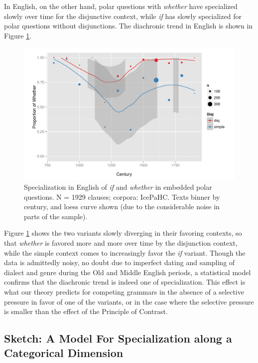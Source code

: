 In English, on the other hand, polar questions with \textsl{whether} have specialized slowly over time for the disjunctive context, while \textsl{if} has slowly specialized for polar questions without disjunctions.
The diachronic trend in English is shown in Figure \ref{whetherfig}.

\begin{figure}
    \begin{center}
    \includegraphics[scale=.7]{whetherifEngLoess.pdf}
    \caption{Specialization in English of \textsl{if} and \textsl{whether} in embedded polar questions. N = 1929 clauses; corpora: IcePaHC. Texts binner by century, and loess curve shown (due to the considerable noise in parts of the sample).}
    \label{whetherfig}
    \end{center}
\end{figure}

Figure \ref{whetherfig} shows the two variants slowly diverging in their favoring contexts, so that \textsl{whether} is favored more and more over time by the disjunction context, while the simple context comes to increasingly favor the \textsl{if} variant.
Though the data is admittedly noisy, no doubt due to imperfect dating and sampling of dialect and genre during the Old and Middle English periods, a statistical model confirms that the diachronic trend is indeed one of specialization. 
This effect is what our theory predicts for competing grammars in the absence of a selective pressure in favor of one of the variants, or in the case where the selective pressure is smaller than the effect of the Principle of Contrast.

\subsection{Sketch: A Model For Specialization along a Categorical Dimension}

